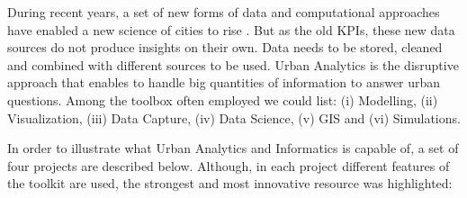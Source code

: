 During recent years, a set of new forms of data and computational approaches have enabled a new science of cities to rise \parencite{battyNewScienceCities2013}. But as the old KPIs, these new data sources do not produce insights on their own. Data needs to be stored, cleaned and combined with different sources to be used. Urban Analytics is the disruptive approach that enables to handle big quantities of information to answer urban questions. Among the toolbox often employed we could list: (i) Modelling, (ii) Visualization, (iii) Data Capture, (iv) Data Science, (v) GIS and (vi) Simulations. \par

In order to illustrate what Urban Analytics and Informatics is capable of, a set of four projects are described below. Although, in each project different features of the toolkit are used, the strongest and most innovative resource was highlighted: 



